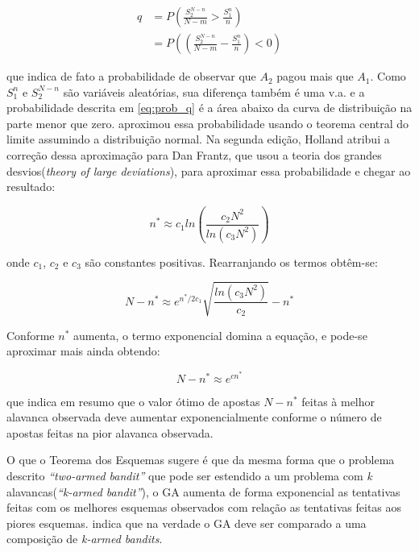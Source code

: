 \begin{align}
q 	&= P\left(\frac{S_2^{N-n}}{N-m} > \frac{S_1^n}{n}\right) \nonumber \\
	&= P\left( \left( \frac{S_2^{N-n}}{N-m} - \frac{S_1^n}{n} \right) < 0 \right)
\label{eq:prob_q}
\end{align}

que indica de fato a probabilidade de observar que \(A_2\) pagou mais que \(A_1\). Como \(S_1^n\) e \(S_2^{N-n}\) são variáveis aleatórias, sua diferença também é uma v.a. e a probabilidade descrita em \autoref{eq:prob_q} é a área abaixo da curva de distribuição na parte menor que zero. \citeauthor{Holland1992} aproximou essa probabilidade usando o teorema central do limite assumindo a distribuição normal. Na segunda edição, Holland atribui a correção dessa aproximação para Dan Frantz, que usou a teoria dos grandes desvios(\textit{theory of large deviations}), para aproximar essa probabilidade e chegar ao resultado:

\begin{equation*}
n^* \approx c_1 ln\left( \frac{c_2 N^2}{ln(c_3 N^2)} \right)
\end{equation*}

onde \(c_1\), \(c_2\) e \(c_3\) são constantes positivas. Rearranjando os termos obtêm-se:

\begin{equation*}
N - n^* \approx e^{n^*/2c_1} \sqrt{\frac{ln(c_3 N^2)}{c_2}} - n^*
\end{equation*}

Conforme \(n^*\) aumenta, o termo exponencial domina a equação, e pode-se aproximar mais ainda obtendo:

\begin{equation*}
N - n^* \approx e^{cn^*}
\end{equation*}

que indica em resumo que o valor ótimo de apostas \(N-n^*\) feitas à melhor alavanca observada deve aumentar exponencialmente conforme o número de apostas feitas na pior alavanca observada. \cite{Mitchell1996}

O que o Teorema dos Esquemas sugere é que da mesma forma que o problema descrito \textit{``two-armed bandit''} que pode ser estendido a um problema com \textit{k} alavancas(\textit{``k-armed bandit''}), o GA aumenta de forma exponencial as tentativas feitas com os melhores esquemas observados com relação as tentativas feitas aos piores esquemas. \citeauthor{Goldberg1989} indica que na verdade o GA deve ser comparado a uma composição de \textit{k-armed bandits}.

